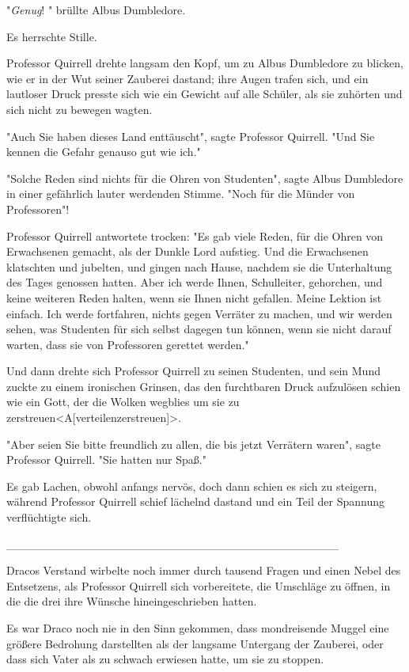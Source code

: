 {"\emph{Genug}! " brüllte Albus Dumbledore.

Es herrschte Stille.

Professor Quirrell drehte langsam den Kopf, um zu Albus Dumbledore zu blicken, wie er in der Wut seiner Zauberei dastand; ihre Augen trafen sich, und ein lautloser Druck presste sich wie ein Gewicht auf alle Schüler, als sie zuhörten und sich nicht zu bewegen wagten.

"Auch Sie haben dieses Land enttäuscht", sagte Professor Quirrell. "Und Sie kennen die Gefahr genauso gut wie ich."

"Solche Reden sind nichts für die Ohren von Studenten", sagte Albus Dumbledore in einer gefährlich lauter werdenden Stimme. "Noch für die Münder von Professoren"!

Professor Quirrell antwortete trocken: "Es gab viele Reden, für die Ohren von Erwachsenen gemacht, als der Dunkle Lord aufstieg. Und die Erwachsenen klatschten und jubelten, und gingen nach Hause, nachdem sie die Unterhaltung des Tages genossen hatten. Aber ich werde Ihnen, Schulleiter, gehorchen, und keine weiteren Reden halten, wenn sie Ihnen nicht gefallen. Meine Lektion ist einfach. Ich werde fortfahren, nichts gegen Verräter zu machen, und wir werden sehen, was Studenten für sich selbst dagegen tun können, wenn sie nicht darauf warten, dass sie von Professoren gerettet werden."

Und dann drehte sich Professor Quirrell zu seinen Studenten, und sein Mund zuckte zu einem ironischen Grinsen, das den furchtbaren Druck aufzulösen schien wie ein Gott, der die Wolken wegblies um sie zu zerstreuen\textless A{[}verteilen\textbar zerstreuen{]}\textgreater.

"Aber seien Sie bitte freundlich zu allen, die bis jetzt Verrätern waren", sagte Professor Quirrell. "Sie hatten nur Spaß."

Es gab Lachen, obwohl anfangs nervös, doch dann schien es sich zu steigern, während Professor Quirrell schief lächelnd dastand und ein Teil der Spannung verflüchtigte sich.

\_\_\_\_\_\_\_\_\_\_\_\_\_\_\_\_\_\_\_\_\_\_\_\_\_\_\_\_\_\_\_\_\_\_\_\_\_\_\_\_

Dracos Verstand wirbelte noch immer durch tausend Fragen und einen Nebel des Entsetzens, als Professor Quirrell sich vorbereitete, die Umschläge zu öffnen, in die die drei ihre Wünsche hineingeschrieben hatten.

Es war Draco noch nie in den Sinn gekommen, dass mondreisende Muggel eine größere Bedrohung darstellten als der langsame Untergang der Zauberei, oder dass sich Vater als zu schwach erwiesen hatte, um sie zu stoppen.

}
